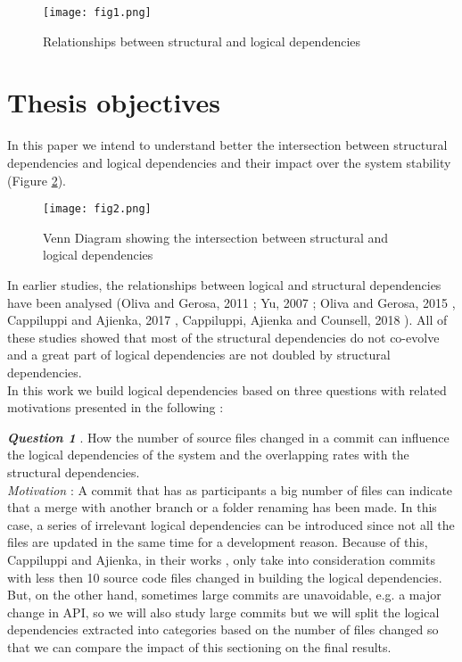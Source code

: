 \begin{figure}[h]
\centering
\texttt{[image: fig1.png]}
\caption{Relationships between structural and logical dependencies }
\label{fig:fig1}
\centering
\end{figure}

\section {Thesis objectives}
In this paper we intend to understand better the intersection between structural dependencies and logical dependencies and their impact over the system stability (Figure \ref{fig:fig2}). 

\begin{figure}[h]
\centering
\texttt{[image: fig2.png]}
\caption{Venn Diagram showing the intersection between structural and logical dependencies }
\label{fig:fig2}
\end{figure}

\tab In earlier studies, the relationships between logical and structural dependencies have been analysed (Oliva and Gerosa, 2011 \cite{ct_oliva2011} ; Yu, 2007 \cite{ct5};  Oliva and Gerosa, 2015 \cite{ct6}, Cappiluppi and Ajienka, 2017 \cite{ct8},  Cappiluppi, Ajienka and Counsell, 2018 \cite{cappilupi2}). All of these studies showed that most of the structural dependencies do not co-evolve and a great part of logical dependencies are not doubled by structural dependencies.\\

\tab In this work we build logical dependencies based on three questions with related motivations presented in the following :

\textit{\textbf{Question 1}} . How the number of source files changed in a commit can influence the logical dependencies of the system and the overlapping rates with the structural dependencies.\\
\textit{Motivation} : A commit that has as participants a big number of files can indicate that a merge with another branch or a folder renaming has been made. In this case, a series of irrelevant logical dependencies can be introduced since not all the files are updated in the same time for a development reason. Because of this, Cappiluppi and Ajienka, in their works \cite{cappilupi2}, \cite{ct8} only take into consideration commits with less then 10 source code files changed in building the logical dependencies. But, on the other hand, sometimes large commits are unavoidable, e.g. a major change in API, so we will also study large commits but we will split the logical dependencies extracted into categories based on the number of files changed so that we can compare the impact of this sectioning on the final results.

